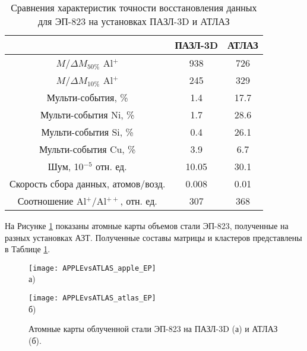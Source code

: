 \begin{table} [htbp]
	\centering
	\caption{Сравнения характеристик точности восстановления данных для ЭП-823 на установках ПАЗЛ-3D и АТЛАЗ}
	\label{tab:paramsAPPLEvsATLAS_EP3}
	\begin{SingleSpace}
		\begin{tabular} {| c | c | c |}
			\hline
			{}                                     & ПАЗЛ-3D & АТЛАЗ   \\ \hline
			$M/\Delta M_{50\%}$ Al$^+$             & 938     & 726     \\ \hline
			$M/\Delta M_{10\%}$ Al$^+$             & 245     & 329     \\ \hline
			Мульти-события, \%                     & 1.4     & 17.7                 \\ \hline
			Мульти-события Ni, \%                  & 1.7     & 28.6             \\ \hline
			Мульти-события Si, \%                  & 0.4     & 26.1             \\ \hline
			Мульти-события Cu, \%                  & 3.9     & 6.7             \\ \hline
			Шум, 10$^{-5}$ отн. ед.                & 10.05   & 30.1     \\ \hline
			Скорость сбора данных, атомов/возд.    & 0.008   & 0.01  \\ \hline
			Соотношение Al$^+$/Al$^{++}$, отн. ед. & 307     & 368     \\ \hline
		\end{tabular}
	\end{SingleSpace}
\end{table}

На Рисунке \cref{fig:APPLEvsATLAS_EP} показаны атомные карты объемов стали ЭП-823, полученные на разных установках АЗТ. Полученные составы матрицы и кластеров представлены в Таблице \cref{fig:APPLEvsATLAS_EP}.

\begin{figure}[h!tb]
	\begin{minipage}[b][][b]{0.49\textwidth}\centering
		\texttt{[image: APPLEvsATLAS\_apple\_EP]} \\ а)
	\end{minipage}
	\begin{minipage}[b][][b]{0.49\textwidth}\centering
		\texttt{[image: APPLEvsATLAS\_atlas\_EP]} \\ б)
	\end{minipage}
	\caption{Атомные карты \cite{scbibAPPLEvsATLAS} облученной стали ЭП-823 на ПАЗЛ-3D (а) и АТЛАЗ (б).}
	\label{fig:APPLEvsATLAS_EP}
\end{figure} 

